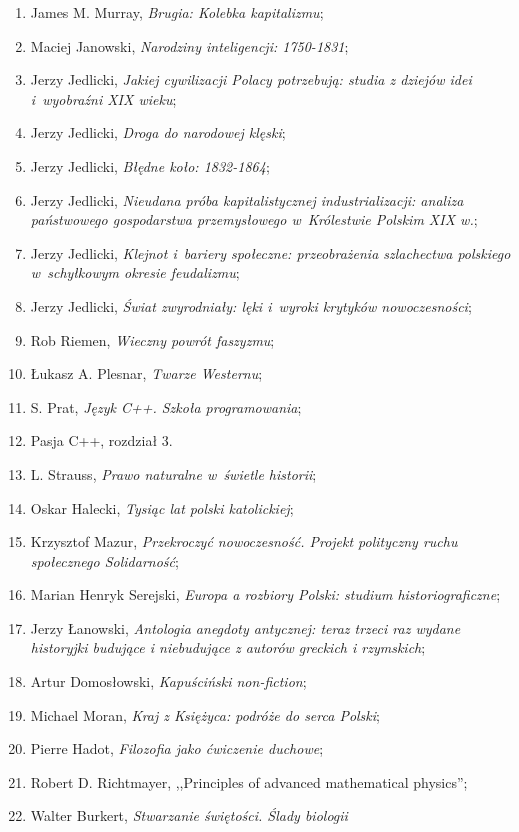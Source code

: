 \documentclass[a4paper,11pt]{article}
\begin{document}
\begin{enumerate}
{    Wytwórni Filmów Oświatowych};
\item James M. Murray, \emph{Brugia: Kolebka kapitalizmu};
\item Maciej Janowski, \emph{Narodziny inteligencji: 1750-1831};
\item Jerzy Jedlicki, \emph{Jakiej cywilizacji Polacy potrzebują:
    studia z dziejów idei i~wyobraźni XIX wieku};
\item Jerzy Jedlicki, \emph{Droga do narodowej klęski};
\item Jerzy Jedlicki, \emph{Błędne koło: 1832-1864};
\item Jerzy Jedlicki, \emph{Nieudana próba kapitalistycznej
    industrializacji: analiza państwowego gospodarstwa przemysłowego
    w~Królestwie Polskim XIX w.};
\item Jerzy Jedlicki, \emph{Klejnot i~bariery społeczne: przeobrażenia
    szlachectwa polskiego w~schyłkowym okresie feudalizmu};
\item Jerzy Jedlicki, \emph{Świat zwyrodniały: lęki i~wyroki krytyków
    nowoczesności};
\item Rob Riemen, \emph{Wieczny powrót faszyzmu};
\item Łukasz A. Plesnar, \emph{Twarze Westernu};
\item S. Prat, \emph{Język C++. Szkoła programowania};
\item Pasja C++, rozdział 3.
\item L. Strauss, \emph{Prawo naturalne w~świetle historii};
\item Oskar Halecki, \emph{Tysiąc lat polski katolickiej};
\item Krzysztof Mazur, \emph{Przekroczyć nowoczesność. Projekt
    polityczny ruchu społecznego Solidarność};
\item Marian Henryk Serejski, \emph{Europa a rozbiory Polski: studium
    historiograficzne};
\item Jerzy Łanowski, \emph{Antologia anegdoty antycznej: teraz trzeci
    raz wydane historyjki budujące i niebudujące z autorów greckich i
    rzymskich};
\item Artur Domosłowski, \emph{Kapuściński non-fiction};
\item Michael Moran, \emph{Kraj z Księżyca: podróże do serca Polski};
\item Pierre Hadot, \emph{Filozofia jako ćwiczenie duchowe};
\item Robert D. Richtmayer, ,,Principles of advanced mathematical
  physics'';
\item Walter Burkert, \emph{Stwarzanie świętości. Ślady biologii
}
\end{enumerate}
\end{document}
